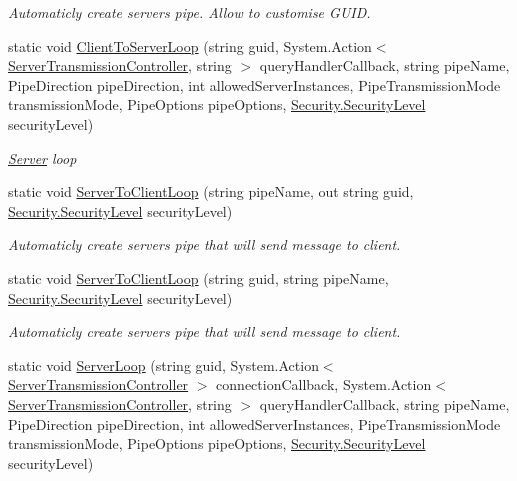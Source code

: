 \begin{DoxyCompactItemize}
\begin{DoxyCompactList}\small\item\em Automaticly create server\textquotesingle{}s pipe. Allow to customise G\+U\+ID. \end{DoxyCompactList}\item 
static void \mbox{\hyperlink{class_pipes_provider_1_1_server_1_1_server_a_p_i_af18d8b4e9a47d04f072b3ec8940d70e2}{Client\+To\+Server\+Loop}} (string guid, System.\+Action$<$ \mbox{\hyperlink{class_pipes_provider_1_1_server_1_1_server_transmission_controller}{Server\+Transmission\+Controller}}, string $>$ query\+Handler\+Callback, string pipe\+Name, Pipe\+Direction pipe\+Direction, int allowed\+Server\+Instances, Pipe\+Transmission\+Mode transmission\+Mode, Pipe\+Options pipe\+Options, \mbox{\hyperlink{namespace_pipes_provider_1_1_security_a1a6020eca1c661a6f7140e8260502d7e}{Security.\+Security\+Level}} security\+Level)
\begin{DoxyCompactList}\small\item\em \mbox{\hyperlink{namespace_pipes_provider_1_1_server}{Server}} loop \end{DoxyCompactList}\item 
static void \mbox{\hyperlink{class_pipes_provider_1_1_server_1_1_server_a_p_i_ad9ecb3352296ddc3b57fc14e6033cd4a}{Server\+To\+Client\+Loop}} (string pipe\+Name, out string guid, \mbox{\hyperlink{namespace_pipes_provider_1_1_security_a1a6020eca1c661a6f7140e8260502d7e}{Security.\+Security\+Level}} security\+Level)
\begin{DoxyCompactList}\small\item\em Automaticly create server\textquotesingle{}s pipe that will send message to client. \end{DoxyCompactList}\item 
static void \mbox{\hyperlink{class_pipes_provider_1_1_server_1_1_server_a_p_i_a2e4ac901af731290f1065d08b982f32b}{Server\+To\+Client\+Loop}} (string guid, string pipe\+Name, \mbox{\hyperlink{namespace_pipes_provider_1_1_security_a1a6020eca1c661a6f7140e8260502d7e}{Security.\+Security\+Level}} security\+Level)
\begin{DoxyCompactList}\small\item\em Automaticly create server\textquotesingle{}s pipe that will send message to client. \end{DoxyCompactList}\item 
static void \mbox{\hyperlink{class_pipes_provider_1_1_server_1_1_server_a_p_i_a3dc9cedca51d49b25e4cdf30b32a4f5b}{Server\+Loop}} (string guid, System.\+Action$<$ \mbox{\hyperlink{class_pipes_provider_1_1_server_1_1_server_transmission_controller}{Server\+Transmission\+Controller}} $>$ connection\+Callback, System.\+Action$<$ \mbox{\hyperlink{class_pipes_provider_1_1_server_1_1_server_transmission_controller}{Server\+Transmission\+Controller}}, string $>$ query\+Handler\+Callback, string pipe\+Name, Pipe\+Direction pipe\+Direction, int allowed\+Server\+Instances, Pipe\+Transmission\+Mode transmission\+Mode, Pipe\+Options pipe\+Options, \mbox{\hyperlink{namespace_pipes_provider_1_1_security_a1a6020eca1c661a6f7140e8260502d7e}{Security.\+Security\+Level}} security\+Level)

\end{DoxyCompactItemize}
